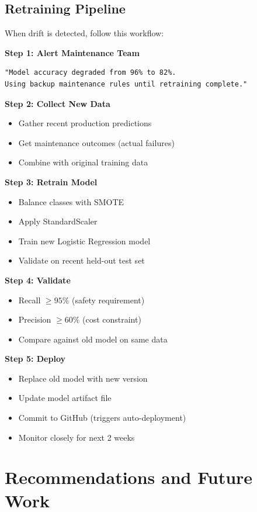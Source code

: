 \documentclass[11pt,a4paper]{article}
\begin{document}
\subsection{Retraining Pipeline}

When drift is detected, follow this workflow:

\textbf{Step 1: Alert Maintenance Team}
\begin{verbatim}
"Model accuracy degraded from 96% to 82%.
Using backup maintenance rules until retraining complete."
\end{verbatim}

\textbf{Step 2: Collect New Data}
\begin{itemize}
    \item Gather recent production predictions
    \item Get maintenance outcomes (actual failures)
    \item Combine with original training data
\end{itemize}

\textbf{Step 3: Retrain Model}
\begin{itemize}
    \item Balance classes with SMOTE
    \item Apply StandardScaler
    \item Train new Logistic Regression model
    \item Validate on recent held-out test set
\end{itemize}

\textbf{Step 4: Validate}
\begin{itemize}
    \item Recall $\geq 95\%$ (safety requirement)
    \item Precision $\geq 60\%$ (cost constraint)
    \item Compare against old model on same data
\end{itemize}

\textbf{Step 5: Deploy}
\begin{itemize}
    \item Replace old model with new version
    \item Update model artifact file
    \item Commit to GitHub (triggers auto-deployment)
    \item Monitor closely for next 2 weeks
\end{itemize}

\section{Recommendations and Future Work}
\end{document}
